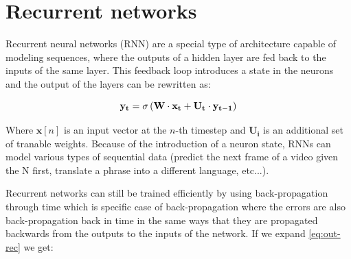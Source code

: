 


\section{Recurrent networks}

Recurrent neural networks (RNN) are a special type of architecture capable of modeling sequences, where the outputs of a hidden layer are fed back to the inputs of the same layer. This feedback loop introduces a state in the neurons and the output of the layers can be rewritten as:

\begin{equation}
    \centering
    \mathbf{y_t} = \sigma \left ( \mathbf{W} \cdot \mathbf{x_t} + \mathbf{U_t} \cdot \mathbf{y_{t-1}} \right )
    \label{eq:out-rec}
\end{equation}

Where $\mathbf{x}[n]$ is an input vector at the $n$-th timestep and $\mathbf{U_i}$ is an additional set of tranable weights. Because of the introduction of a neuron state, RNNs can model various types of sequential data (predict the next frame of a video given the N first, translate a phrase into a different language, etc...).

Recurrent networks can still be trained efficiently by using back-propagation through time \cite{werbos1990backpropagation} which is specific case of back-propagation where the errors are also back-propagation back in time in the same ways that they are propagated backwards from the outputs to the inputs of the network. If we expand \ref{eq:out-rec} we get:

